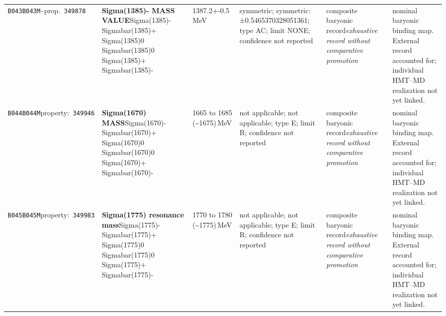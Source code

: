 \begin{landscape}
\begin{longtable}{L{1.85cm}L{4.45cm}L{2.35cm}L{4.05cm}L{3.35cm}L{7.15cm}}
\texttt{B043}\newline \texttt{B043M-}\newline prop.\ \texttt{349878} & \textbf{Sigma(1385)- MASS VALUE}\newline Sigma(1385)- \textbar{}\allowbreak{} Sigmabar(1385)+ \textbar{}\allowbreak{} Sigma(1385)0 \textbar{}\allowbreak{} Sigmabar(1385)0 \textbar{}\allowbreak{} Sigma(1385)+ \textbar{}\allowbreak{} Sigmabar(1385)- & 1387.2+-0.5\,MeV & symmetric; symmetric: ±0.5465370328051361; type AC; limit NONE; confidence not reported & composite baryonic record\newline \emph{exhaustive record without comparative promotion} & nominal baryonic binding map. External record accounted for; individual HMT--MD realization not yet linked. \\
\texttt{B044}\newline \texttt{B044M}\newline property:\ \texttt{349946} & \textbf{Sigma(1670) MASS}\newline Sigma(1670)- \textbar{}\allowbreak{} Sigmabar(1670)+ \textbar{}\allowbreak{} Sigma(1670)0 \textbar{}\allowbreak{} Sigmabar(1670)0 \textbar{}\allowbreak{} Sigma(1670)+ \textbar{}\allowbreak{} Sigmabar(1670)- & 1665 to 1685 (\textasciitilde{}1675)\,MeV & not applicable; not applicable; type E; limit R; confidence not reported & composite baryonic record\newline \emph{exhaustive record without comparative promotion} & nominal baryonic binding map. External record accounted for; individual HMT--MD realization not yet linked. \\
\texttt{B045}\newline \texttt{B045M}\newline property:\ \texttt{349983} & \textbf{Sigma(1775) resonance mass}\newline Sigma(1775)- \textbar{}\allowbreak{} Sigmabar(1775)+ \textbar{}\allowbreak{} Sigma(1775)0 \textbar{}\allowbreak{} Sigmabar(1775)0 \textbar{}\allowbreak{} Sigma(1775)+ \textbar{}\allowbreak{} Sigmabar(1775)- & 1770 to 1780 (\textasciitilde{}1775)\,MeV & not applicable; not applicable; type E; limit R; confidence not reported & composite baryonic record\newline \emph{exhaustive record without comparative promotion} & nominal baryonic binding map. External record accounted for; individual HMT--MD realization not yet linked. \\

\end{longtable}
\end{landscape}
